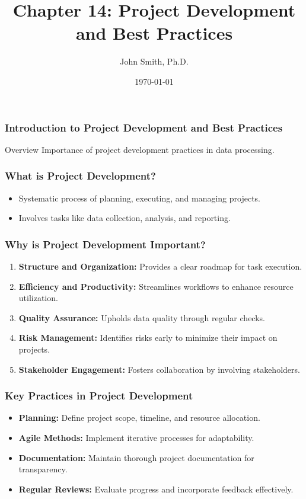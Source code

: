 \documentclass[aspectratio=169]{beamer}
\title[Project Development]{Chapter 14: Project Development and Best Practices}
\author[J. Smith]{John Smith, Ph.D.}
\institute[University Name]{
  Department of Computer Science\\
  University Name\\
  \vspace{0.3cm}
  Email: email@university.edu\\
  Website: www.university.edu
}
\date{\today}
\begin{document}
\frame{\titlepage}

\begin{frame}[fragile]
    \frametitle{Introduction to Project Development and Best Practices}
    \begin{block}{Overview}
        Importance of project development practices in data processing.
    \end{block}
\end{frame}

\begin{frame}[fragile]
    \frametitle{What is Project Development?}
    \begin{itemize}
        \item Systematic process of planning, executing, and managing projects.
        \item Involves tasks like data collection, analysis, and reporting.
    \end{itemize}
\end{frame}

\begin{frame}[fragile]
    \frametitle{Why is Project Development Important?}
    \begin{enumerate}
        \item \textbf{Structure and Organization:} Provides a clear roadmap for task execution.
        \item \textbf{Efficiency and Productivity:} Streamlines workflows to enhance resource utilization.
        \item \textbf{Quality Assurance:} Upholds data quality through regular checks.
        \item \textbf{Risk Management:} Identifies risks early to minimize their impact on projects.
        \item \textbf{Stakeholder Engagement:} Fosters collaboration by involving stakeholders.
    \end{enumerate}
\end{frame}

\begin{frame}[fragile]
    \frametitle{Key Practices in Project Development}
    \begin{itemize}
        \item \textbf{Planning:} Define project scope, timeline, and resource allocation.
        \item \textbf{Agile Methods:} Implement iterative processes for adaptability.
        \item \textbf{Documentation:} Maintain thorough project documentation for transparency.
        \item \textbf{Regular Reviews:} Evaluate progress and incorporate feedback effectively.
    \end{itemize}
\end{frame}
\end{document}

